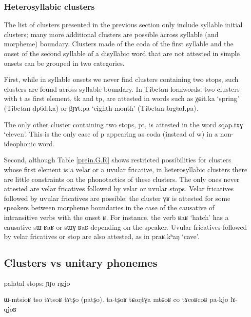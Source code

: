 \documentclass[oldfontcommands,oneside,a4paper,11pt]{article}
\newcommand{\ipa}[1]{{\phon #1}} %
\begin{document}
 
 
 \subsubsection{Heterosyllabic clusters} \label{sec:heterosyllabic.clusters}
 
 The list of clusters presented in the previous section only include syllable initial clusters; many more additional clusters are possible across syllable (and morpheme) boundary. Clusters made of the coda of the first syllable and the onset of the second syllable of a disyllabic word that are not attested in simple onsets can be grouped in two categories.
 
 First, while in syllable onsets we never find clusters containing two stops, such clusters are found across syllable boundary. In Tibetan loanwords, two clusters with \ipa{t} as first element,  \ipa{tk} and \ipa{tp}, are attested in words such as \ipa{χɕit.ka} `spring' (Tibetan \ipa{dpʲid.ka}) or \ipa{βɟɤt.pa} `eighth month' (Tibetan \ipa{brgʲad.pa}). 
 
 The only  other cluster containing two stops, \ipa{pt}, is attested in the word  \ipa{sqap.tɤɣ} `eleven'. This is the only case of \ipa{p} appearing as coda (instead of \ipa{w}) in a non-ideophonic  word.
 
 Second, although Table \ref{prein.G.R} shows restricted possibilities for clusters whose first element is a velar or a uvular fricative, in heterosyllabic clusters there are little constraints on the phonotactics of these clusters. The only ones never attested are velar fricatives followed by velar or uvular stops. Velar fricatives followed by uvular fricatives are possible:  the cluster \ipa{ɣʁ} is attested for some speakers between morpheme boundaries in the case of the causative of intransitive verbs with the onset \ipa{ʁ}. For instance, the verb \ipa{ʁaʁ} `hatch' has a causative \ipa{sɯ-ʁaʁ} or \ipa{sɯɣ-ʁaʁ} depending on the speaker. Uvular fricatives followed by velar fricatives or stop are also attested, as in \ipa{praʁ.kʰaŋ} `cave'.
 
 
      \subsection{Clusters vs unitary phonemes} \label{sec:non.clusters}
      
      
palatal stops:      
      \ipa{ɲɟo} \ipa{ŋgjo}
      
      ɯ-mtsioʁ
	tso tɤtsoʁ 
	tɤtʂo (patʂo). ta-tʂoʁ
 tɕoŋtɣa mtɕoʁ
 co tɤcoʁcoʁ
 pa-kjo
     lɤ-qjoʁ
\end{document}
